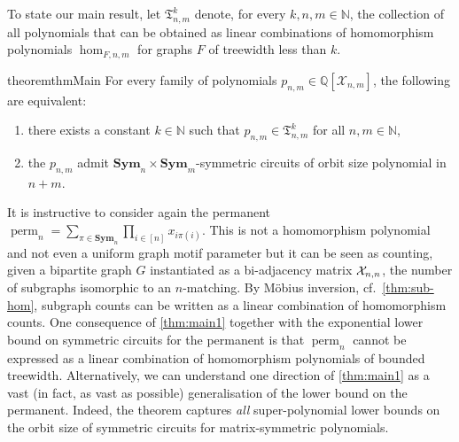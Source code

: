 \documentclass[11pt, DIV=15]{scrarticle}
\theoremstyle{definition}
\theoremstyle{plain}
\theoremstyle{remark}
\newcommand{\Xx}{{\cal X}}
\DeclareMathOperator{\perm}{perm}
\newcommand{\Sym}{\mathbf{Sym}}
\newcommand{\bbN}{\mathbb{N}}
\begin{document}
To state our main result, let $\mathfrak{T}_{n,m}^k$ denote, for every $k,n,m \in \bbN$, the collection of all polynomials that can be obtained as linear combinations of homomorphism polynomials $\hom_{F,n,m}$ for graphs $F$ of treewidth less than $k$.
\begin{restatable}{theorem}{thmMain}\label{thm:main1}
	For every family of polynomials $p_{n,m} \in \mathbb{Q}[\mathcal{X}_{n,m}]$, the following are equivalent:
	\begin{enumerate}
		\item there exists a constant $k \in \mathbb{N}$ such that $p_{n,m} \in \mathfrak{T}_{n,m}^k$ for all $n,m \in \mathbb{N}$,\label{it:main1}
		\item the $p_{n,m}$ admit $\Sym_n \times \Sym_m$-symmetric circuits of orbit size polynomial in $n+m$.\label{it:main2}
	\end{enumerate}
\end{restatable}

It is instructive to consider again the permanent $\perm_n = \sum_{\pi \in \Sym_n} \prod_{i \in [n]} x_{i\pi(i)}$. 
This is not a homomorphism polynomial
and not even a uniform graph motif parameter
 but it can be seen as counting, given a bipartite graph $G$ instantiated as a bi-adjacency matrix $\Xx_{n,n}$, the number of subgraphs isomorphic to an $n$-matching. 
By M\"obius inversion, cf.\ \cref{thm:sub-hom}, subgraph counts can be written as a linear combination of homomorphism counts.
One consequence of \cref{thm:main1} together with the exponential lower bound on symmetric circuits for the permanent \cite{dawar_symmetric_2025} is that $\perm_n$ cannot be expressed as a linear combination of homomorphism polynomials of bounded treewidth.  
Alternatively, we can understand one direction of \cref{thm:main1} as a vast (in fact, as vast as possible) generalisation of the lower bound on the permanent. 
Indeed, the theorem captures \emph{all} super-polynomial lower bounds on the orbit size of symmetric circuits for matrix-symmetric polynomials.
\end{document}
